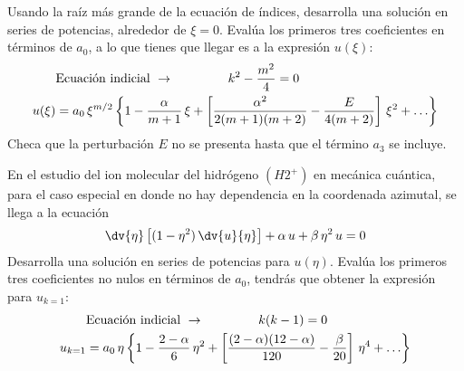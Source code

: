 \begin{milista}
Usando la raíz más grande de la ecuación de índices, desarrolla una solución en series de potencias, alrededor de $\xi=0$. Evalúa los primeros tres coeficientes en términos de $a_{0}$, a lo que tienes que llegar es a la expresión $u (\xi)$:
\begin{align*}
& \text{Ecuación indicial } \to \hspace{1.5cm} k^{2} - \dfrac{m^{2}}{4} = 0 \\
u(\xi) &=  a_{0} \, \xi^{m/2} \left\lbrace 1 - \dfrac{\alpha}{m+1} \, \xi + \left[ \dfrac{\alpha^{2}}{2(m+1)(m+2)} - \dfrac{E}{4(m+2)} \right] \, \xi^{2} + \ldots \right\rbrace
\end{align*}
Checa que la perturbación $E$ no se presenta hasta que el término $a_{3}$ se incluye.
\item En el estudio del ion molecular del hidrógeno $(H2^{+})$ en mecánica cuántica, para el caso especial en donde no hay dependencia en la coordenada azimutal, se llega a la ecuación
\begin{align*}
\dv{\eta} \left[ (1 - \eta^{2} ) \, \dv{u}{\eta} \right] + \alpha \, u + \beta \, \eta^{2} \, u = 0
\end{align*}
Desarrolla una solución en series de potencias para $u(\eta)$. Evalúa los primeros tres coeficientes no nulos en términos de $a_{0}$, tendrás que obtener la expresión para $u_{k=1}$:
\begin{align*}
& \text{Ecuación indicial } \to \hspace{1.5cm} k(k-1) = 0 \\
u_{k=1} &=  a_{0} \, \eta \left\lbrace 1 - \dfrac{2- \alpha}{6} \, \eta^{2} + \left[ \dfrac{(2-\alpha)(12-\alpha)}{120} - \dfrac{\beta}{20} \right] \, \eta^{4} + \ldots \right\rbrace
\end{align*}

\end{milista}
